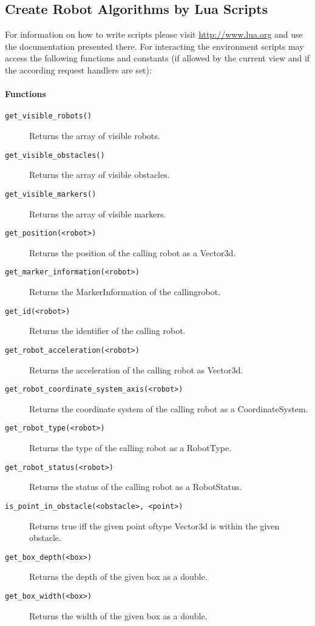 \documentclass[a4paper,halfparskip,11pt,twoside]{scrartcl}
\begin{document}
\subsection{Create Robot Algorithms by Lua Scripts}
For information on how to write \Lua scripts please visit \url{http://www.lua.org} and use the documentation presented there. For interacting the environment \Lua scripts may access the following functions and constants (if allowed by the current view and if the according request handlers are set):

\paragraph{\Lua Functions}
\begin{description}
	\item [\texttt{get\_visible\_robots()}] Returns the array of visible robots.
	\item [\texttt{get\_visible\_obstacles()}] Returns the array of visible obstacles.
	\item [\texttt{get\_visible\_markers()}] Returns the array of visible markers.
	\item [\texttt{get\_position(<robot>)}] Returns the position of the calling robot as a Vector3d.
	\item [\texttt{get\_marker\_information(<robot>)}] Returns the MarkerInformation of the calling\linebreak robot.
	\item [\texttt{get\_id(<robot>)}] Returns the identifier of the calling robot.
	\item [\texttt{get\_robot\_acceleration(<robot>)}] Returns the acceleration of the calling robot as Vector3d.
	\item [\texttt{get\_robot\_coordinate\_system\_axis(<robot>)}] Returns the coordinate system of the calling robot as a CoordinateSystem.
	\item [\texttt{get\_robot\_type(<robot>)}] Returns the type of the calling robot as a RobotType.
	\item [\texttt{get\_robot\_status(<robot>)}] Returns the status of the calling robot as a RobotStatus.
	\item [\texttt{is\_point\_in\_obstacle(<obstacle>, <point>)}] Returns true iff the given point of\linebreak type Vector3d is within the given obstacle.
	\item [\texttt{get\_box\_depth(<box>)}] Returns the depth of the given box as a double.
	\item [\texttt{get\_box\_width(<box>)}] Returns the width of the given box as a double.

\end{description}
\end{document}
